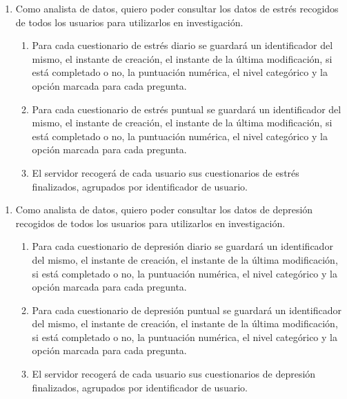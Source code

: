         \begin{enumerate}[resume=req-usuario,label=\textbf{\texttt{RU-\arabic*}}]
            \item \label{req:usuario:analista_estres} Como analista de datos, quiero poder consultar los datos de estrés recogidos de todos los usuarios para utilizarlos en investigación.
            \begin{enumerate}[resume=req-funcionales,label=\textbf{\texttt{RF-\arabic*}}]
                 \item \label{req:funcionales:estres_diario_formato} Para cada cuestionario de estrés diario se guardará un identificador del mismo, el instante de creación, el instante de la última modificación, si está completado o no, la puntuación numérica, el nivel categórico y la opción marcada para cada pregunta.
                \item \label{req:funcionales:estres_puntual_formato} Para cada cuestionario de estrés puntual se guardará un identificador del mismo, el instante de creación, el instante de la última modificación, si está completado o no, la puntuación numérica, el nivel categórico y la opción marcada para cada pregunta.
                \item \label{req:funcionales:estres_finalizado_servidor} El servidor recogerá de cada usuario sus cuestionarios de estrés finalizados, agrupados por identificador de usuario.
            \end{enumerate}
        \end{enumerate}
        \begin{enumerate}[resume=req-usuario,label=\textbf{\texttt{RU-\arabic*}}]
            \item \label{req:usuario:analista_depresion} Como analista de datos, quiero poder consultar los datos de depresión recogidos de todos los usuarios para utilizarlos en investigación.
            \begin{enumerate}[resume=req-funcionales,label=\textbf{\texttt{RF-\arabic*}}]
                 \item \label{req:funcionales:depresion_diario_formato} Para cada cuestionario de depresión diario se guardará un identificador del mismo, el instante de creación, el instante de la última modificación, si está completado o no, la puntuación numérica, el nivel categórico y la opción marcada para cada pregunta.
                \item \label{req:funcionales:depresion_puntual_formato} Para cada cuestionario de depresión puntual se guardará un identificador del mismo, el instante de creación, el instante de la última modificación, si está completado o no, la puntuación numérica, el nivel categórico y la opción marcada para cada pregunta.
                \item \label{req:funcionales:depresion_finalizado_servidor} El servidor recogerá de cada usuario sus cuestionarios de depresión finalizados, agrupados por identificador de usuario.
            \end{enumerate}
        \end{enumerate}
